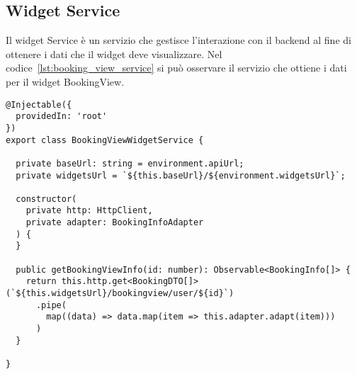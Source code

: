 \subsection{Widget Service}
Il widget Service è un servizio che gestisce l'interazione con il backend al fine di ottenere i dati che il widget deve visualizzare. Nel codice~\ref{lst:booking_view_service} si può osservare il servizio che ottiene i dati per il widget BookingView.
\begin{lstlisting}[caption={booking-view-widget.service.ts},label={lst:booking_view_service},style=javascriptCode]
@Injectable({
  providedIn: 'root'
})
export class BookingViewWidgetService {

  private baseUrl: string = environment.apiUrl;
  private widgetsUrl = `${this.baseUrl}/${environment.widgetsUrl}`;

  constructor(
    private http: HttpClient,
    private adapter: BookingInfoAdapter
  ) {
  }

  public getBookingViewInfo(id: number): Observable<BookingInfo[]> {
    return this.http.get<BookingDTO[]>(`${this.widgetsUrl}/bookingview/user/${id}`)
      .pipe(
        map((data) => data.map(item => this.adapter.adapt(item)))
      )
  }

}
\end{lstlisting}


